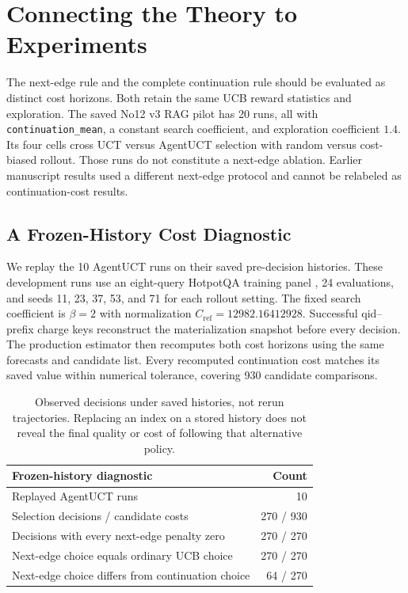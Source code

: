\section{Connecting the Theory to Experiments}
\label{sec:experiments}
The next-edge rule and the complete continuation rule should be evaluated as distinct cost horizons. Both retain the same UCB reward statistics and exploration. The saved No12 v3 RAG pilot has 20 runs, all with \texttt{continuation\_mean}, a constant search coefficient, and exploration coefficient $1.4$. Its four cells cross UCT versus AgentUCT selection with random versus cost-biased rollout. Those runs do not constitute a next-edge ablation. Earlier manuscript results used a different next-edge protocol and cannot be relabeled as continuation-cost results.

\subsection{A Frozen-History Cost Diagnostic}
We replay the 10 AgentUCT runs on their saved pre-decision histories. These development runs use an eight-query HotpotQA training panel \citep{yang2018hotpotqa}, 24 evaluations, and seeds 11, 23, 37, 53, and 71 for each rollout setting. The fixed search coefficient is $\beta=2$ with normalization $C_{\mathrm{ref}}=12982.16412928$. Successful qid--prefix charge keys reconstruct the materialization snapshot before every decision. The production estimator then recomputes both cost horizons using the same forecasts and candidate list. Every recomputed continuation cost matches its saved value within numerical tolerance, covering 930 candidate comparisons.

\begin{table}[t]
\centering
\small
\begin{tabularx}{\columnwidth}{@{}>{\raggedright\arraybackslash}Xr@{}}
\toprule
Frozen-history diagnostic & Count\\
\midrule
Replayed AgentUCT runs & 10\\
Selection decisions / candidate costs & 270 / 930\\
Decisions with every next-edge penalty zero & 270 / 270\\
Next-edge choice equals ordinary UCB choice & 270 / 270\\
Next-edge choice differs from continuation choice & 64 / 270\\
\bottomrule
\end{tabularx}
\caption{Observed decisions under saved histories, not rerun trajectories. Replacing an index on a stored history does not reveal the final quality or cost of following that alternative policy.}
\label{tab:nextreplay}
\end{table}

